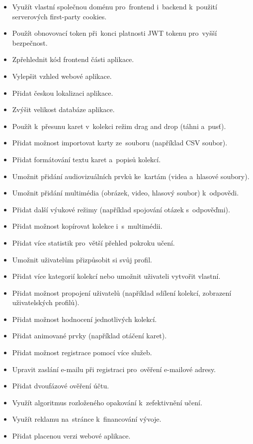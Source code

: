 \documentclass[twoside]{ctuthesis}
\begin{document}
\begin{itemize}
\item Využít vlastní společnou doménu pro~frontend i~backend k~použití serverových first-party cookies.
\item Použít obnovovací token při~konci platnosti JWT tokenu pro~vyšší bezpečnost.
\item Zpřehlednit kód frontend části aplikace.
\item Vylepšit vzhled webové aplikace.
\item Přidat českou lokalizaci aplikace.
\item Zvýšit velikost databáze aplikace.
\item Použít k~přesunu karet v~kolekci režim drag and drop (táhni a~pusť).
\item Přidat možnost importovat karty ze~souboru (například CSV soubor).
\item Přidat formátování textu karet a~popisů kolekcí.
\item Umožnit přidání audiovizuálních prvků ke~kartám (videa a~hlasové soubory).
\item Umožnit přidání multimédia (obrázek, video, hlasový soubor) k~odpovědi.
\item Přidat další výukové režimy (například spojování otázek s~odpověďmi).
\item Přidat možnost kopírovat kolekce i~s~multimédii.
\item Přidat více statistik pro~větší přehled pokroku učení.
\item Umožnit uživatelům přizpůsobit si svůj profil.
\item Přidat více kategorií kolekcí nebo umožnit uživateli vytvořit vlastní.
\item Přidat možnost propojení uživatelů (například sdílení kolekcí, zobrazení uživatelských profilů).
\item Přidat možnost hodnocení jednotlivých kolekcí.
\item Přidat animované prvky (například otáčení karet).
\item Přidat možnost registrace pomocí více služeb.
\item Upravit zaslání e-mailu při registraci pro~ověření e-mailové adresy.
\item Přidat dvoufázové ověření účtu.
\item Využít algoritmus rozloženého opakování k~zefektivnění učení.
\item Využít reklamu na~stránce k~financování vývoje.
\item Přidat placenou verzi webové aplikace.
\end{itemize}
\end{document}
